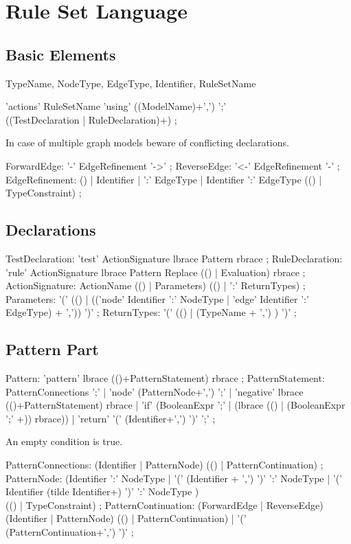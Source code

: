 \chapter{Rule Set Language}

\section{Basic Elements}
TypeName, NodeType, EdgeType, Identifier, RuleSetName

\begin{rail}
  'actions' RuleSetName 'using' ((ModelName)+',') ';' \\ ((TestDeclaration | RuleDeclaration)+) ;
\end{rail}
In case of multiple graph models beware of conflicting declarations.

\begin{rail}
  ForwardEdge: '-' EdgeRefinement '->' ;
  ReverseEdge: '<-' EdgeRefinement '-' ;  
  EdgeRefinement: () | Identifier | ':' EdgeType | Identifier ':' EdgeType (() | TypeConstraint) ;
\end{rail}

\section{Declarations}
\begin{rail}
  TestDeclaration: 'test' ActionSignature lbrace Pattern rbrace ;
  RuleDeclaration: 'rule' ActionSignature lbrace Pattern Replace (() | Evaluation) rbrace ;
  ActionSignature: ActionName (() | Parameters) (() | ':' ReturnTypes) ;
  Parameters: '(' (() | (('node' Identifier ':' NodeType | 'edge' Identifier ':' EdgeType) + ',')) ')' ;
  ReturnTypes: '(' (() | (TypeName + ',') ) ')' ;
\end{rail}

\section{Pattern Part}
\begin{rail}
  Pattern: 'pattern' lbrace (()+PatternStatement) rbrace ;
  PatternStatement: PatternConnections ';' |
    'node' (PatternNode+',') ';' |
    'negative' lbrace (()+PatternStatement) rbrace |
    'if' (BooleanExpr ';' | (lbrace (() | (BooleanExpr ';' +)) rbrace)) |
    'return' '(' (Identifier+',') ')' ';' ;
\end{rail} 
An empty condition is true.

\begin{rail}   
  PatternConnections: (Identifier | PatternNode) (() | PatternContinuation) ;
  PatternNode: (Identifier ':' NodeType 
    | '(' (Identifier + ',') ')' ':' NodeType
    | '(' Identifier (tilde Identifier+) ')' ':' NodeType ) \\
      (() | TypeConstraint) ; 
  PatternContinuation: (ForwardEdge | ReverseEdge) (Identifier | PatternNode) (() | PatternContinuation) |
    '(' (PatternContinuation+',') ')' ; 
\end{rail}

